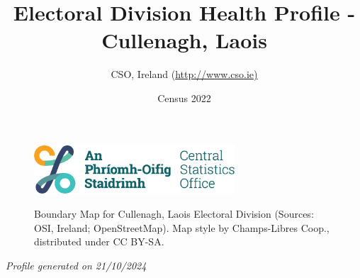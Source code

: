 \documentclass{article}
\title{Electoral Division Health Profile - Cullenagh, Laois}
\date{Census 2022}
\author{CSO, Ireland  (\url{http://www.cso.ie)}}
\begin{document}


\begin{figure}
	\centering
\includegraphics[width =75mm]{../figures/CSO_Logo.png}
\end{figure}

\begin{figure}[h]
	\centering
	\setlength{\fboxsep}{1pt}
	\caption{\normalsize Boundary Map for Cullenagh, Laois Electoral Division (Sources: OSI, Ireland; OpenStreetMap). Map style by Champs-Libres Coop., distributed under CC BY-SA.}
	\label{fig:2ae19629-1a6a-13a3-e055-000000000001}
	\end{figure}
	{\let\newpage\relax\maketitle}
	     \begin{center}
         \emph{Profile generated on 21/10/2024}
     \end{center}
\end{document}
